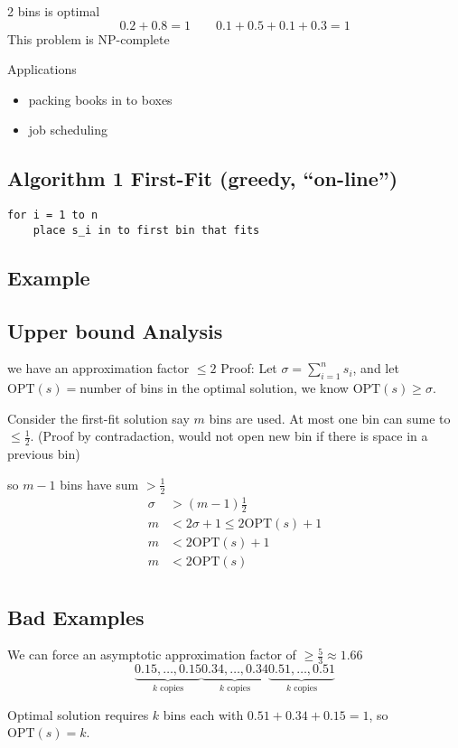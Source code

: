 \documentclass[english,12pt]{article}
\theoremstyle{plain}
\theoremstyle{definition}
\theoremstyle{definition} %
\begin{document}
2 bins is optimal
\[0.2+0.8=1\qquad 0.1+0.5+0.1+0.3=1\]
This problem is NP-complete

Applications
\begin{itemize}
\item packing books in to boxes
\item job scheduling
\end{itemize}

\subsection{Algorithm 1 First-Fit (greedy, ``on-line'')}
\begin{verbatim}
for i = 1 to n
    place s_i in to first bin that fits
\end{verbatim}

\subsection{Example}
\subsection{Upper bound Analysis}
we have an approximation factor $\le 2$
Proof: Let $\sigma = \sum_{i=1}^n s_i$, and let $\text{OPT}(s)=$number of bins in the optimal solution, we know $\text{OPT}(s)\ge \sigma$.

Consider the first-fit solution say $m$ bins are used.  At most one bin can sume to $\le\frac{1}{2}$.  (Proof by contradaction, would not open new bin if there is space in a previous bin)

so $m-1$ bins have sum $>\frac{1}{2}$
\begin{align*}
\sigma &> (m-1)\frac{1}{2}\\
m &< 2\sigma + 1 \le 2 \text{OPT}(s) + 1\\
m &< 2\text{OPT}(s) + 1\\
m &< 2\text{OPT}(s)\\
\end{align*}

\subsection{Bad Examples}
We can force an asymptotic approximation factor of $\ge\frac{5}{3}\approx 1.66$
\[\underbrace{0.15,\ldots, 0.15}_{k\text{ copies}}\underbrace{0.34,\ldots, 0.34}_{k\text{ copies}}\underbrace{0.51,\ldots, 0.51}_{k\text{ copies}}\]

Optimal solution requires $k$ bins each with $0.51 + 0.34 + 0.15 = 1$, so $\text{OPT}(s)=k$.
\end{document}
